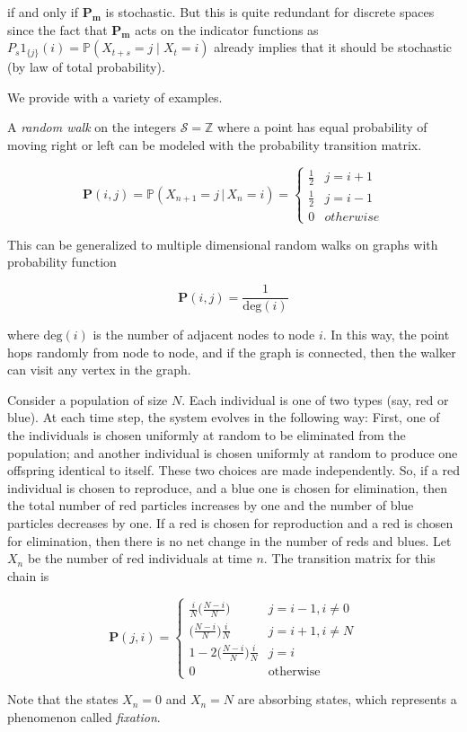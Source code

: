 \documentclass{article}
\begin{document}
  if and only if $\mathbf{P_m}$ is stochastic. But this is quite redundant for discrete spaces since the fact that $\mathbf{P_m}$ acts on the indicator functions as $P_s 1_{\{j\}} (i) = \mathbb{P}(X_{t + s} = j \mid X_t = i)$ already implies that it should be stochastic (by law of total probability). 

  We provide with a variety of examples. 

  \begin{example}
    A \textit{random walk} on the integers $\mathcal{S} = \mathbb{Z}$ where a point has equal probability of moving right or left can be modeled with the probability transition matrix. 

      \[\mathbf{P}(i, j) = \mathbb{P}(X_{n+1} = j \, | \, X_n = i) = \begin{cases}
      \frac{1}{2} & j = i + 1 \\
      \frac{1}{2} & j = i - 1\\
      0 & otherwise
      \end{cases}\]

    This can be generalized to multiple dimensional random walks on graphs with probability function 

      \[\mathbf{P}(i, j) = \frac{1}{\text{deg}(i)}\]

    where $\mathrm{deg}(i)$ is the number of adjacent nodes to node $i$. In this way, the point hops randomly from node to node, and if the graph is connected, then the walker can visit any vertex in the graph. 
  \end{example}

  \begin{example}
    Consider a population of size $N$. Each individual is one of two types (say, red or blue). At each time step, the system evolves in the following way: First, one of the individuals is chosen uniformly at random to be eliminated from the population; and another individual is chosen uniformly at random to produce one offspring identical to itself. These two choices are made independently. So, if a red individual is chosen to reproduce, and a blue one is chosen for elimination, then the total number of red particles increases by one and the number of blue particles decreases by one. If a red is chosen for reproduction and a red is chosen for elimination, then there is no net change in the number of reds and blues. Let $X_n$ be the number of red individuals at time $n$. The transition matrix for this chain is

      \[\mathbf{P}(j, i) = \begin{cases}
      \frac{i}{N} \bigg(\frac{N-i}{N} \bigg) & j=i-1, i \neq 0 \\
      \bigg(\frac{N-i}{N} \bigg) \frac{i}{N} & j=i+1, i \neq N \\
      1 - 2 \bigg(\frac{N-i}{N} \bigg) \frac{i}{N} & j = i \\
      0 & \text{otherwise}
      \end{cases}\]

    Note that the states $X_n = 0$ and $X_n = N$ are absorbing states, which represents a phenomenon called \textit{fixation}. 
  \end{example}
\end{document}
